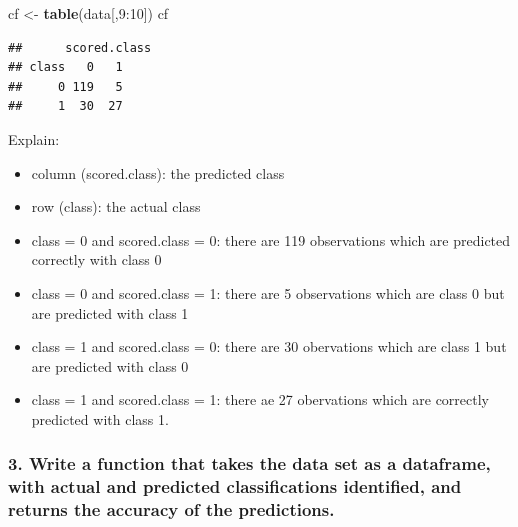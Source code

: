 \documentclass[]{article}
\newenvironment{Shaded}{\begin{snugshade}}{\end{snugshade}}
\newcommand{\KeywordTok}[1]{\textcolor[rgb]{0.13,0.29,0.53}{\textbf{{#1}}}}
\newcommand{\DecValTok}[1]{\textcolor[rgb]{0.00,0.00,0.81}{{#1}}}
\newcommand{\StringTok}[1]{\textcolor[rgb]{0.31,0.60,0.02}{{#1}}}
\newcommand{\NormalTok}[1]{{#1}}
\providecommand{\tightlist}{%
  \setlength{\itemsep}{0pt}\setlength{\parskip}{0pt}}
\begin{document}
\begin{Shaded}
\begin{Highlighting}[]
\NormalTok{cf <-}\StringTok{ }\KeywordTok{table}\NormalTok{(data[,}\DecValTok{9}\NormalTok{:}\DecValTok{10}\NormalTok{])}
\NormalTok{cf}
\end{Highlighting}
\end{Shaded}

\begin{verbatim}
##      scored.class
## class   0   1
##     0 119   5
##     1  30  27
\end{verbatim}

Explain:

\begin{itemize}
\tightlist
\item
  column (scored.class): the predicted class
\item
  row (class): the actual class
\item
  class = 0 and scored.class = 0: there are 119 observations which are
  predicted correctly with class 0
\item
  class = 0 and scored.class = 1: there are 5 observations which are
  class 0 but are predicted with class 1
\item
  class = 1 and scored.class = 0: there are 30 obervations which are
  class 1 but are predicted with class 0
\item
  class = 1 and scored.class = 1: there ae 27 obervations which are
  correctly predicted with class 1.
\end{itemize}

\subsubsection{3. Write a function that takes the data set as a
dataframe, with actual and predicted classifications identified, and
returns the accuracy of the
predictions.}\label{write-a-function-that-takes-the-data-set-as-a-dataframe-with-actual-and-predicted-classifications-identified-and-returns-the-accuracy-of-the-predictions.}

\begin{Shaded}
\end{Shaded}
\end{document}
